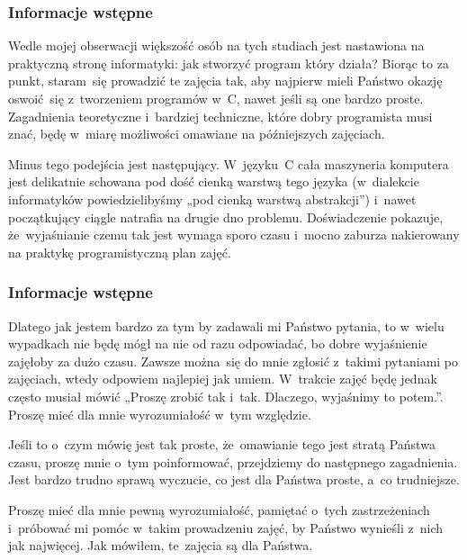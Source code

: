 \documentclass[10pt,t]{beamer}
\begin{document}
\begin{frame}
  \frametitle{Informacje wstępne}


  Wedle mojej obserwacji większość osób na tych studiach jest nastawiona
  na praktyczną stronę informatyki: jak stworzyć program który działa?
  Biorąc to za punkt, staram~się prowadzić te zajęcia tak, aby najpierw
  mieli Państwo okazję oswoić~się z~tworzeniem programów w~C, nawet jeśli
  są one bardzo proste. Zagadnienia teoretyczne i~bardziej techniczne,
  które dobry programista musi znać, będę w~miarę możliwości omawiane
  na późniejszych zajęciach.

  Minus tego podejścia jest następujący. W~języku~C cała maszyneria
  komputera jest delikatnie schowana pod dość cienką warstwą tego języka
  (w~dialekcie informatyków powiedzielibyśmy „pod cienką warstwą
  abstrakcji”) i~nawet początkujący ciągle natrafia na drugie dno problemu.
  Doświadczenie pokazuje, że~wyjaśnianie czemu tak jest wymaga sporo czasu
  i~mocno zaburza nakierowany na praktykę programistyczną plan zajęć.

\end{frame}





\begin{frame}
  \frametitle{Informacje wstępne}


  Dlatego jak jestem \alert{bardzo} za tym by zadawali mi Państwo pytania,
  to w~wielu wypadkach nie będę mógł na nie od razu odpowiadać, bo
  dobre wyjaśnienie zajęłoby za dużo czasu. Zawsze można~się do mnie
  zgłosić z~takimi pytaniami po zajęciach, wtedy odpowiem najlepiej
  jak umiem. W~trakcie zajęć będę jednak często musiał mówić „Proszę zrobić
  tak i~tak. Dlaczego, wyjaśnimy to potem.”. Proszę mieć dla mnie
  wyrozumiałość w~tym względzie.

  Jeśli to o~czym mówię jest tak proste, że~omawianie tego jest stratą
  Państwa czasu, proszę mnie o~tym poinformować, przejdziemy do następnego
  zagadnienia. Jest bardzo trudno sprawą wyczucie, co jest dla Państwa
  proste, a~co trudniejsze.

  Proszę mieć dla mnie pewną wyrozumiałość, pamiętać o~tych zastrzeżeniach
  i~próbować mi pomóc w~takim prowadzeniu zajęć, by Państwo wynieśli z~nich
  jak najwięcej. Jak mówiłem, te~zajęcia są dla Państwa.

\end{frame}
\end{document}

